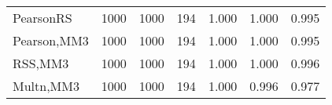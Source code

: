 \documentclass[
]{article}
\begin{document}
\begin{table}[H]
{\begin{tabular}[t]{lrrrrrr}
\hspace{1em}PearsonRS & 1000 & 1000 & 194 & 1.000 & 1.000 & 0.995\\
\hspace{1em}Pearson,MM3 & 1000 & 1000 & 194 & 1.000 & 1.000 & 0.995\\
\hspace{1em}RSS,MM3 & 1000 & 1000 & 194 & 1.000 & 1.000 & 0.996\\
\hspace{1em}Multn,MM3 & 1000 & 1000 & 194 & 1.000 & 0.996 & 0.977\\
\bottomrule
\end{tabular}}
\end{table}
\end{document}
